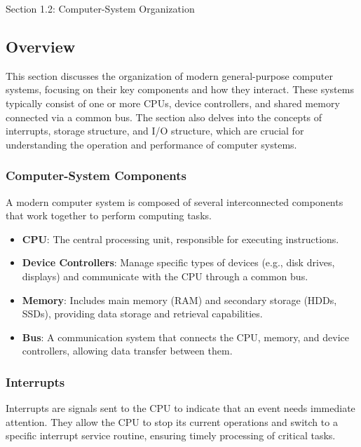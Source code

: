 \begin{notes}{Section 1.2: Computer-System Organization}
    \subsection*{Overview}

    This section discusses the organization of modern general-purpose computer systems, focusing on their key components and how they interact. These systems typically consist of one or more CPUs, 
    device controllers, and shared memory connected via a common bus. The section also delves into the concepts of interrupts, storage structure, and I/O structure, which are crucial for understanding 
    the operation and performance of computer systems.
    
    \subsubsection*{Computer-System Components}
    
    A modern computer system is composed of several interconnected components that work together to perform computing tasks.
    
    \begin{highlight}
    
    \begin{itemize}
        \item \textbf{CPU}: The central processing unit, responsible for executing instructions.
        \item \textbf{Device Controllers}: Manage specific types of devices (e.g., disk drives, displays) and communicate with the CPU through a common bus.
        \item \textbf{Memory}: Includes main memory (RAM) and secondary storage (HDDs, SSDs), providing data storage and retrieval capabilities.
        \item \textbf{Bus}: A communication system that connects the CPU, memory, and device controllers, allowing data transfer between them.
    \end{itemize}
    
    \end{highlight}
    
    \subsubsection*{Interrupts}
    
    Interrupts are signals sent to the CPU to indicate that an event needs immediate attention. They allow the CPU to stop its current operations and switch to a specific interrupt service routine, 
    ensuring timely processing of critical tasks.
    

\end{notes}
